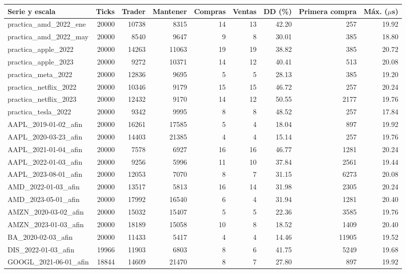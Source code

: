 \documentclass[10pt,a4paper,landscape]{article}
\begin{document}
\begin{longtable}{lrrrrrrrr}\toprule
Serie y escala & Ticks & Trader & Mantener & Compras & Ventas & DD (\%) & Primera compra & Máx. ($\mu$s) \\\midrule\endhead
practica\_amd\_2022\_ene & 20000 & 10738 & 8315 & 14 & 13 & 42.20 & 257 & 19.92 \\
practica\_amd\_2022\_may & 20000 & 8540 & 9647 & 9 & 8 & 30.01 & 385 & 18.80 \\
practica\_apple\_2022 & 20000 & 14263 & 11063 & 19 & 19 & 38.82 & 385 & 20.72 \\
practica\_apple\_2023 & 20000 & 9272 & 10371 & 14 & 12 & 40.41 & 513 & 20.08 \\
practica\_meta\_2022 & 20000 & 12836 & 9695 & 5 & 5 & 28.13 & 385 & 19.20 \\
practica\_netflix\_2022 & 20000 & 10346 & 9179 & 15 & 15 & 46.72 & 257 & 20.24 \\
practica\_netflix\_2023 & 20000 & 12432 & 9170 & 14 & 12 & 50.55 & 2177 & 19.76 \\
practica\_tesla\_2022 & 20000 & 9342 & 9995 & 8 & 8 & 48.52 & 257 & 17.84 \\
AAPL\_2019-01-02\_afin & 20000 & 16261 & 17585 & 5 & 4 & 18.04 & 897 & 19.92 \\
AAPL\_2020-03-23\_afin & 20000 & 14403 & 21385 & 4 & 4 & 15.14 & 257 & 19.76 \\
AAPL\_2021-01-04\_afin & 20000 & 7578 & 6927 & 16 & 16 & 46.77 & 1281 & 20.24 \\
AAPL\_2022-01-03\_afin & 20000 & 9256 & 5996 & 11 & 10 & 37.84 & 2561 & 19.44 \\
AAPL\_2023-08-01\_afin & 20000 & 12053 & 7070 & 8 & 7 & 31.15 & 6273 & 20.08 \\
AMD\_2022-01-03\_afin & 20000 & 13517 & 5813 & 16 & 14 & 31.98 & 2305 & 20.24 \\
AMD\_2023-05-01\_afin & 20000 & 17992 & 16540 & 6 & 4 & 31.94 & 1281 & 20.40 \\
AMZN\_2020-03-02\_afin & 20000 & 15032 & 15407 & 5 & 5 & 22.36 & 3585 & 19.76 \\
AMZN\_2023-01-03\_afin & 20000 & 18189 & 15058 & 10 & 8 & 18.52 & 1409 & 20.40 \\
BA\_2020-02-03\_afin & 20000 & 11433 & 5417 & 4 & 4 & 14.46 & 11905 & 19.52 \\
DIS\_2022-01-03\_afin & 19966 & 11903 & 6803 & 8 & 6 & 41.75 & 5249 & 19.68 \\
GOOGL\_2021-06-01\_afin & 18844 & 14609 & 21470 & 8 & 7 & 27.80 & 897 & 19.92 \\

\end{longtable}
\end{document}
